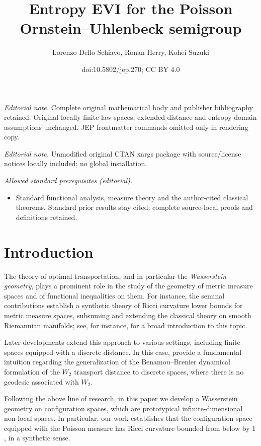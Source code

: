 \documentclass[10pt]{amsart}
\title{Entropy EVI for the Poisson Ornstein–Uhlenbeck semigroup}
\author{Lorenzo Dello Schiavo, Ronan Herry, Kohei Suzuki}
\date{doi:10.5802/jep.270; CC BY 4.0}
\theoremstyle{definition}
\theoremstyle{remark}
\begin{document}
\maketitle
\noindent\textit{Editorial note.} Complete original mathematical body and publisher bibliography retained. Original locally finite-law spaces, extended distance and entropy-domain assumptions unchanged. JEP frontmatter commands omitted only in rendering copy.\par\medskip
\noindent\textit{Editorial note.} Unmodified original CTAN xargs package with source/license notices locally included; no global installation.\par\medskip
\noindent\textit{Allowed standard prerequisites (editorial).}\begin{itemize}
\item Standard functional analysis, measure theory and the author-cited classical theorems. Standard prior results stay cited; complete source-local proofs and definitions retained.
\end{itemize}\medskip
\tableofcontents


\vspace*{-2.5\baselineskip}\enlargethispage{.5\baselineskip}\mbox{}
\section{Introduction}
The theory of optimal transportation, and in particular the \emph{Wasserstein geometry}, plays a prominent role in the study of the geometry of metric measure spaces and of functional inequalities on them.
For instance, the seminal contributions \cite{Sturm,LottVillani,AGSDuke} establish a synthetic theory of Ricci curvature lower bounds for metric measure spaces, subsuming and extending the classical theory on smooth Riemannian manifolds; see, for instance, \cite[Part\,III]{VillaniOldAndNew} for a broad introduction to this topic.

Later developments extend this approach to various settings, including finite spaces equipped with a discrete distance.
In this case, \cite{Maas,Mielke} provide a fundamental intuition regarding the generalization of the Benamou--Brenier dynamical formulation of the $W_{2}$ transport distance to discrete spaces, where there is no geodesic associated with $W_{2}$.

Following the above line of research, in this paper we develop a Wasserstein geom\-etry on configuration spaces, which are prototypical infinite-dimensional non-local spaces.
In particular, our work establishes that the configuration space equipped with the Poisson measure has Ricci curvature bounded from below by $1$, in a synthetic sense.
\end{document}
